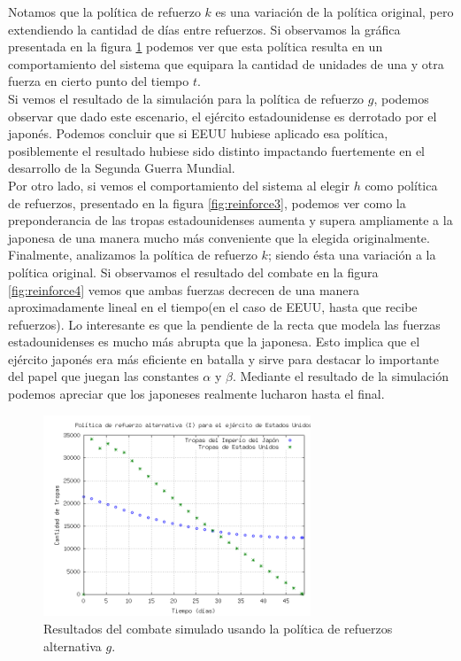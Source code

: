 \documentclass{sig-alternate}
\begin{document}
Notamos que la política de refuerzo $k$ es una variación de la política original, pero extendiendo la cantidad de días entre refuerzos.
Si observamos la gráfica presentada en la figura \ref{fig:reinforce2} podemos ver que esta política resulta en un comportamiento del sistema
que equipara la cantidad de unidades de una y otra fuerza en cierto punto del tiempo $t$.\\
Si vemos el resultado de la simulación para la política de refuerzo $g$, podemos observar que dado este escenario, el ejército estadounidense es derrotado por el japonés. Podemos 
concluir que si EEUU hubiese aplicado esa política, posiblemente el resultado hubiese sido distinto impactando fuertemente en el desarrollo de la Segunda Guerra Mundial.\\
Por otro lado, si vemos el comportamiento del sistema al elegir $h$ como política de refuerzos, presentado en la figura \ref{fig:reinforce3}, 
podemos ver como la preponderancia de las tropas estadounidenses aumenta y supera ampliamente a la japonesa de una manera mucho más conveniente que la elegida originalmente.\\
Finalmente, analizamos la política de refuerzo $k$; siendo ésta una variación a la política original. Si observamos el resultado del combate en la figura \ref{fig:reinforce4}
vemos que ambas fuerzas decrecen de una manera aproximadamente lineal en el tiempo(en el caso de EEUU, hasta que recibe refuerzos). Lo interesante es que la pendiente de la recta
que modela las fuerzas estadounidenses es mucho más abrupta que la japonesa. Esto implica que el ejército japonés era más eficiente en batalla y sirve para destacar lo
importante del papel que juegan las constantes $\alpha$ y $\beta$. Mediante el resultado de la simulación podemos apreciar que los japoneses realmente lucharon hasta el final.

\begin{figure}[h]
\begin{center}
\includegraphics[width=8cm]{reinforce2.png}
\caption{\label{fig:reinforce2}Resultados del combate simulado usando la política de refuerzos alternativa $g$.}
\end{center}
\end{figure}
\end{document}
